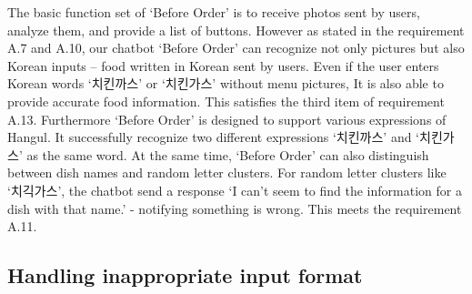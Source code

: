 The basic function set of ‘Before Order’ is to receive photos sent by users, analyze them, and provide a list of buttons. However as stated in the requirement A.7 and A.10, our chatbot ‘Before Order’ can recognize not only pictures but also Korean inputs – food written in Korean sent by users. Even if the user enters Korean words ‘치킨까스’ or ‘치킨가스’ without menu pictures, It is also able to provide accurate food information. This satisfies the third item of requirement A.13. Furthermore ‘Before Order’ is designed to support various expressions of Hangul. It successfully recognize two different expressions ‘치킨까스’ and ‘치킨가스’ as the same word. At the same time, ‘Before Order’ can also distinguish between dish names and random letter clusters. For random letter clusters like ‘치긱가스’, the chatbot send a response ‘I can’t seem to find the information for a dish with that name.’ - notifying something is wrong. This meets the requirement A.11.

\subsection{Handling inappropriate input format}

